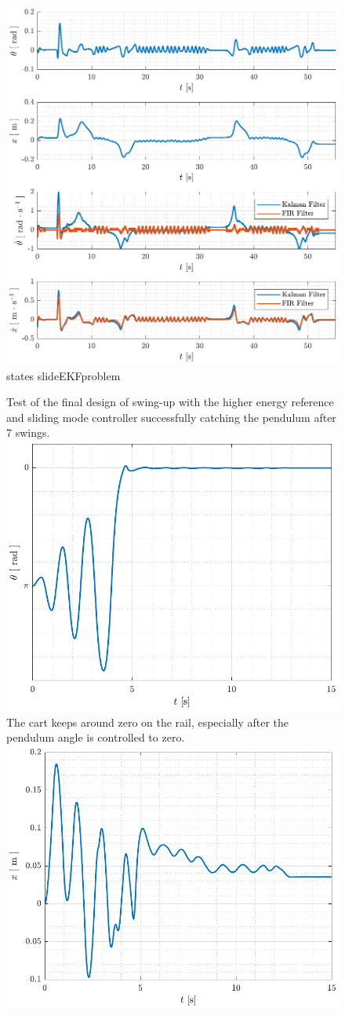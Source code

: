 \begin{figure}[H]
  \includegraphics[width=.7\textwidth]{figures/states_slideEKFproblem}
  \caption{ states slideEKFproblem  }
  \label{fig:states_slideEKFproblem}
\end{figure}


%
\begin{figure}[H]
  \hspace{1cm}
  \captionbox
  {
    Test of the final design of swing-up with the higher energy reference and sliding mode controller successfully catching the pendulum after 7 swings.
    \label{fig:theta_swingNslide}
  }
  {
    \hspace{-1cm}
    \includegraphics[width=.384\textwidth]{figures/theta_swingNslide}
  }
  \hspace{20pt}
  \captionbox 
  {
    The cart keeps around zero on the rail, especially after the pendulum angle is controlled to zero.
    \label{fig:x_swingNslide}
  }
  {
    \hspace{-1cm}
    \includegraphics[width=.4\textwidth]{figures/x_swingNslide}
  }  
\end{figure}

